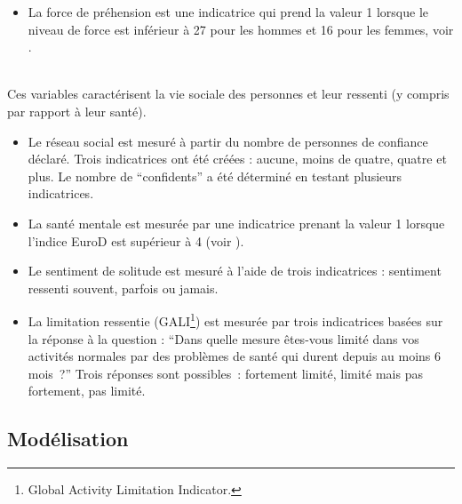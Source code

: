 \begin{Article}
\begin{refsection}[Bonnal]
\begin{itemize}
\item  La force de préhension est une indicatrice qui prend la valeur 1 lorsque le niveau de force est inférieur à 27 pour les hommes et 16 pour les femmes, voir \textcite{dodds2016}.
\end{itemize}



\\

\noindent Ces variables caractérisent la vie sociale des personnes et leur ressenti (y compris par rapport à leur santé).

\begin{itemize}
\item  Le réseau social est mesuré à partir du nombre de personnes de confiance déclaré. Trois indicatrices ont été créées : aucune, moins de quatre, quatre et plus. Le nombre de \enquote{confidents} a été déterminé en testant plusieurs indicatrices.
\item  La santé mentale est mesurée par une indicatrice prenant la valeur 1 lorsque l'indice EuroD est supérieur à 4 (voir \parencite{PRINCE1999}).
\item  Le sentiment de solitude est mesuré à l'aide de trois indicatrices : sentiment ressenti souvent, parfois ou jamais.
\item  La limitation ressentie (GALI\footnote{Global Activity Limitation Indicator.}) est mesurée par trois indicatrices basées sur la réponse à la question : \enquote{Dans quelle mesure êtes-vous limité dans vos activités normales par des problèmes de santé qui durent depuis au moins 6 mois~?} Trois réponses sont possibles~: fortement limité, limité mais pas fortement, pas limité.
\end{itemize}


\subsection{Modélisation}



\end{refsection}
\end{Article}
